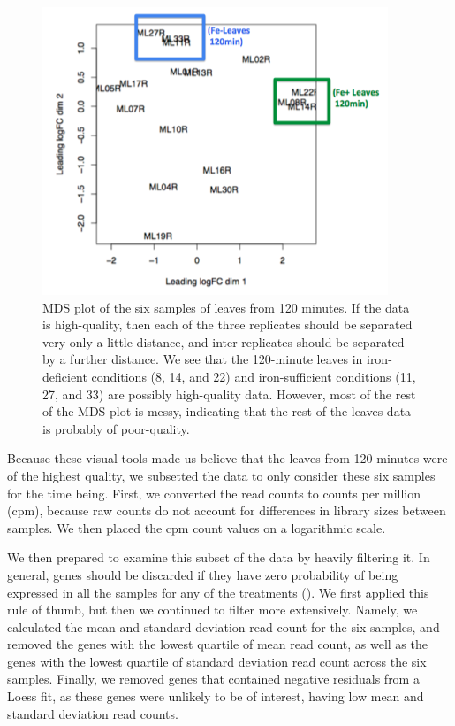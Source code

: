 \documentclass[11pt,a4paper,oldfontcommands,openany]{memoir}
\numberwithin{equation}{section} %
\begin{document}
\begin{figure}[H]
    \centering
    \includegraphics[width=\textwidth]{mdsGroups}
    \caption{MDS plot of the six samples of leaves from 120 minutes. If the data is high-quality, then each of the three replicates should be separated very only a little distance, and inter-replicates should be separated by a further distance. We see that the 120-minute leaves in iron-deficient conditions (8, 14, and 22) and iron-sufficient conditions (11, 27, and 33) are possibly high-quality data. However, most of the rest of the MDS plot is messy, indicating that the rest of the leaves data is probably of poor-quality.}
    \label{fig:mdsGroups}
\end{figure}

Because these visual tools made us believe that the leaves from 120 minutes were of the highest quality, we subsetted the data to only consider these six samples for the time being. First, we converted the read counts to counts per million (cpm), because raw counts  do not account for differences in library sizes between samples. We then placed the cpm count values on a logarithmic scale.

We then prepared to examine this subset of the data by heavily filtering it. In general, genes should be discarded if they have zero probability of being expressed in all the samples for any of the treatments (\citealt{edger}). We first applied this rule of thumb, but then we continued to filter more extensively. Namely, we calculated the mean and standard deviation read count for the six samples, and removed the genes with the lowest quartile of mean read count, as well as the genes with the lowest quartile of standard deviation read count across the six samples. Finally, we removed genes that contained negative residuals from a Loess fit, as these genes were unlikely to be of interest, having low mean and standard deviation read counts.
\end{document}
